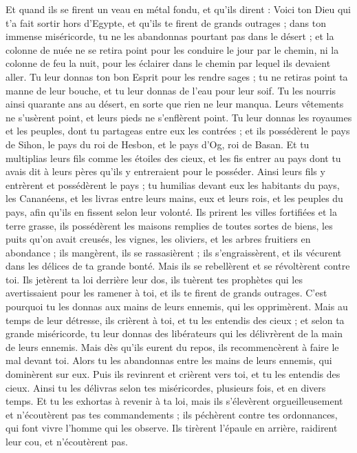\begin{multicols}{2}
Et quand ils se firent un veau en métal fondu, et qu'ils dirent : Voici ton Dieu qui t'a fait sortir hors d'Egypte, et qu'ils te firent de grands outrages ;
dans ton immense miséricorde, tu ne les abandonnas pourtant pas dans le désert ; et la colonne de nuée ne se retira point pour les conduire le jour par le chemin, ni la colonne de feu la nuit, pour les éclairer dans le chemin par lequel ils devaient aller.
Tu leur donnas ton bon Esprit pour les rendre sages ; tu ne retiras point ta manne de leur bouche, et tu leur donnas de l'eau pour leur soif.
Tu les nourris ainsi quarante ans au désert, en sorte que rien ne leur manqua. Leurs vêtements ne s'usèrent point, et leurs pieds ne s'enflèrent point.
Tu leur donnas les royaumes et les peuples, dont tu partageas entre eux les contrées ; et ils possédèrent le pays de Sihon, le pays du roi de Hesbon, et le pays d’Og, roi de Basan.
Et tu multiplias leurs fils comme les étoiles des cieux, et les fis entrer au pays dont tu avais dit à leurs pères qu'ils y entreraient pour le posséder.
Ainsi leurs fils y entrèrent et possédèrent le pays ; tu humilias devant eux les habitants du pays, les Cananéens, et les livras entre leurs mains, eux et leurs rois, et les peuples du pays, afin qu'ils en fissent selon leur volonté.
Ils prirent les villes fortifiées et la terre grasse, ils possédèrent les maisons remplies de toutes sortes de biens, les puits qu'on avait creusés, les vignes, les oliviers, et les arbres fruitiers en abondance ; ils mangèrent, ils se rassasièrent ; ils s'engraissèrent, et ils vécurent dans les délices de ta grande bonté.
Mais ils se rebellèrent et se révoltèrent contre toi. Ils jetèrent ta loi derrière leur dos, ils tuèrent tes prophètes qui les avertissaient pour les ramener à toi, et ils te firent de grands outrages.
C'est pourquoi tu les donnas aux mains de leurs ennemis, qui les opprimèrent. Mais au temps de leur détresse, ils crièrent à toi, et tu les entendis des cieux ; et selon ta grande miséricorde, tu leur donnas des libérateurs qui les délivrèrent de la main de leurs ennemis.
Mais dès qu'ils eurent du repos, ils recommencèrent à faire le mal devant toi. Alors tu les abandonnas entre les mains de leurs ennemis, qui dominèrent sur eux. Puis ils revinrent et crièrent vers toi, et tu les entendis des cieux. Ainsi tu les délivras selon tes miséricordes, plusieurs fois, et en divers temps.
Et tu les exhortas à revenir à ta loi, mais ils s’élevèrent  orgueilleusement et n'écoutèrent pas tes commandements ;  ils péchèrent contre tes ordonnances, qui font vivre l’homme qui les observe. Ils tirèrent l'épaule en arrière, raidirent leur cou, et n'écoutèrent pas.

\end{multicols}
